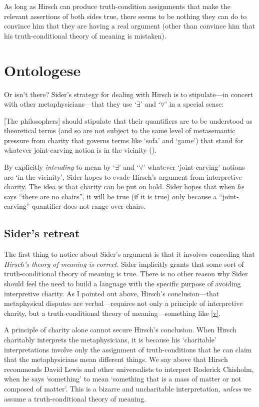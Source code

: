 \documentclass[11pt]{article}
\newenvironment{squote}{%
\begin{spacing}{1}
       	\begin{list}{}{%
\setlength{\labelwidth}{0pt}%
\rightmargin\leftmargin%
}
\item\relax
}{%
\end{list}%
\end{spacing}
}
\begin{document}
\begin{spacing}{1.25}
As long as Hirsch can produce truth-condition assignments that make
the relevant assertions of both sides true, there seems to be nothing
they can do to convince him that they are having a real argument
(other than convince him that his truth-conditional theory of meaning
is mistaken).

\section{Ontologese}
\label{ontologese}
Or isn't there?  Sider's strategy for dealing with Hirsch is to
stipulate---in concert with other metaphysicians---that they use
`$\exists$' and `$\forall$' in a special sense:

\begin{squote}
{[}The philosophers{]} should stipulate that their quantifiers are to be
understood as theoretical terms (and so are not subject to the same
level of metasemantic pressure from charity that governs terms like
`sofa' and `game') that stand for whatever joint-carving notion is in
the vicinity (\citeyear[9]{sider2011b}).
\end{squote}

By explicitly \emph{intending} to mean by `$\exists$' and `$\forall$'
whatever `joint-carving' notions are `in the vicinity', Sider hopes to
evade Hirsch's argument from interpretive charity.  The idea is that
charity can be put on hold.  Sider hopes that when {\em he} says
``there are no chairs'', it will be true (if it is true) only because
a ``joint-carving'' quantifier does not range over chairs.

\subsection{Sider's retreat}
\label{retreat}
The first thing to notice about Sider's argument is that it involves
conceding that {\em Hirsch's theory of meaning is correct}.  Sider
implicitly grants that some sort of truth-conditional theory of
meaning is true.  There is no other reason why Sider should feel the
need to build a language with the specific purpose of avoiding
interpretive charity.  As I pointed out above, Hirsch's
conclusion---that metaphysical disputes are verbal---requires not only
a principle of interpretive charity, but a truth-conditional theory of
meaning---something like \ref{v}.

A principle of charity alone cannot secure Hirsch's conclusion.  When
Hirsch charitably interprets the metaphysicians, it is because his
`charitable' interpretations involve only the assignment of
truth-conditions that he can claim that the metaphysicians mean
different things.  We say above that Hirsch recommends David Lewis and
other universalists to interpret Roderick Chisholm, when he says
`something' to mean `something that is a mass of matter or not
composed of matter'.  This is a bizarre and uncharitable
interpretation, {\em unless} we assume a truth-conditional theory of
meaning.


\end{spacing}
\end{document}

